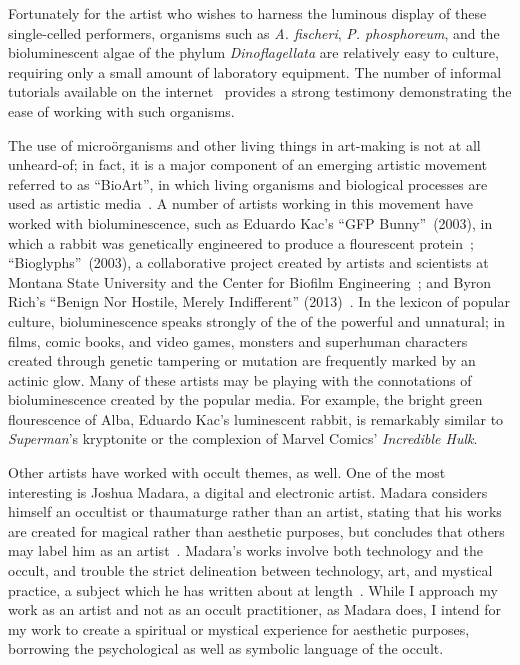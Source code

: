 \documentclass[a4paper,12pt]{article}
\begin{document}
Fortunately for the artist who wishes to harness the luminous display of these single-celled performers, organisms such as \textit{A. fischeri}, \textit{P. phosphoreum}, and the bioluminescent algae of the phylum \textit{Dinoflagellata} are relatively easy to culture, requiring only a small amount of laboratory equipment. The number of informal tutorials available on the internet~\autocite{instructablesLightbulb,instructablesAlgae,instructablesFountain} provides a strong testimony demonstrating the ease of working with such organisms.

The use of micro{\"o}rganisms and other living things in art-making is not at all unheard-of; in fact, it is a major component of an emerging artistic movement referred to as ``BioArt'', in which living organisms and biological processes are used as artistic media~\autocite{anker2004molecular,pentecost2008outfitting}. A number of artists working in this movement have worked with bioluminescence, such as Eduardo Kac's ``GFP Bunny''~(2003), in which a rabbit was genetically engineered to produce a flourescent protein~\autocite{kac2003gfp}; ``Bioglyphs''~(2003), a collaborative project created by artists and scientists at Montana State University and the Center for Biofilm Engineering~\autocite{petkewich2003scientist,bioglyphs}; and Byron Rich's ``Benign Nor Hostile, Merely Indifferent'' (2013)~\autocite{benignNorHostile}. In the lexicon of popular culture, bioluminescence speaks strongly of the of the powerful and unnatural; in films, comic books, and video games, monsters and superhuman characters created through genetic tampering or mutation are frequently marked by an actinic glow. Many of these artists may be playing with the connotations of bioluminescence created by the popular media. For example, the bright green flourescence of Alba, Eduardo Kac's luminescent rabbit, is remarkably similar to \textit{Superman}'s kryptonite or the complexion of Marvel Comics' \textit{Incredible Hulk}.

Other artists have worked with occult themes, as well. One of the most interesting is Joshua Madara, a digital and electronic artist. Madara considers himself an occultist or thaumaturge rather than an artist, stating that his works are created for magical rather than aesthetic purposes, but concludes that others may label him as an artist~\autocite{madara}. Madara's works involve both technology and the occult, and trouble the strict delineation between technology, art, and mystical practice, a subject which he has written about at length~\autocite{madarabeing,madaramagic}. While I approach my work as an artist and not as an occult practitioner, as Madara does, I intend for my work to create a spiritual or mystical experience for aesthetic purposes, borrowing the psychological as well as symbolic language of the occult.
\end{document}
